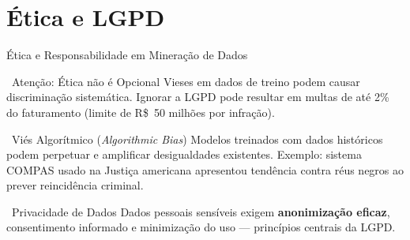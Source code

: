 \documentclass[aspectratio=169]{beamer}
\begin{document}
\section{Ética e LGPD}

\begin{frame}{Ética e Responsabilidade em Mineração de Dados}
    \begin{alertblock}{\faWarning\ Atenção: Ética não é Opcional}
        Vieses em dados de treino podem causar discriminação sistemática. Ignorar a LGPD pode resultar em multas de até 2\% do faturamento (limite de R\$~50 milhões por infração).
    \end{alertblock}
    \vspace{0.2cm}
    \begin{block}{\faBalanceScale\ Viés Algorítmico (\textit{Algorithmic Bias})}
        Modelos treinados com dados históricos podem perpetuar e amplificar desigualdades existentes. Exemplo: sistema COMPAS usado na Justiça americana apresentou tendência contra réus negros ao prever reincidência criminal.
    \end{block}
    \vspace{0.15cm}
    \begin{block}{\faLock\ Privacidade de Dados}
        Dados pessoais sensíveis exigem \textbf{anonimização eficaz}, consentimento informado e minimização do uso --- princípios centrais da LGPD.
    \end{block}
\end{frame}
\end{document}
